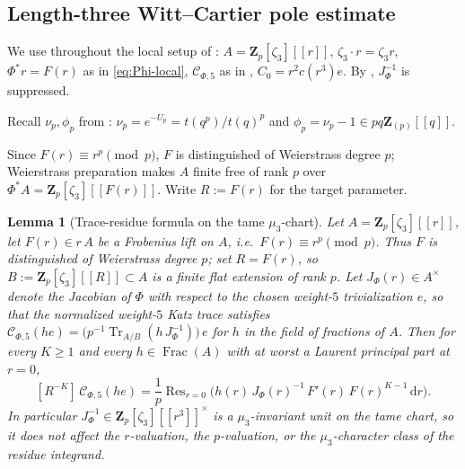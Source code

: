 \documentclass[11pt]{amsart}
\newtheorem{lemma}[theorem]{Lemma}
\theoremstyle{definition}
\theoremstyle{remark}
\newcommand{\Z}{\mathbf{Z}}
\newcommand{\dd}{\mathrm{d}}
\newcommand{\Res}{\operatorname{Res}}
\newcommand{\Tr}{\operatorname{Tr}}
\begin{document}
\subsection{Length-three Witt--Cartier pole estimate}\label{subsec:pole-estimate}

We use throughout the local setup of : $A=\Z_p[\zeta_3][[r]]$, $\zeta_3\cdot r=\zeta_3 r$, $\Phi^*r=F(r)$ as in \eqref{eq:Phi-local}, $\mathcal C_{\Phi,5}$ as in , $C_0=r^2c(r^3)e$. By , $J_\Phi^{-1}$ is suppressed.

Recall $\nu_p,\phi_p$ from : $\nu_p=e^{-U_p}=t(q^p)/t(q)^p$ and $\phi_p=\nu_p-1\in pq\Z_{(p)}[[q]]$.

Since $F(r)\equiv r^p\pmod p$, $F$ is distinguished of Weierstrass degree $p$; Weierstrass preparation makes $A$ finite free of rank $p$ over $\Phi^*A=\Z_p[\zeta_3][[F(r)]]$. Write $R:=F(r)$ for the target parameter.

\begin{lemma}[Trace-residue formula on the tame $\mu_3$-chart]\label{lem:trace-residue-tame}
Let $A=\Z_p[\zeta_3][[r]]$, let $F(r)\in r\,A$ be a Frobenius lift on $A$, i.e.\ $F(r)\equiv r^p\pmod p$. Thus $F$ is distinguished of Weierstrass degree $p$; set $R=F(r)$, so $B:=\Z_p[\zeta_3][[R]]\subset A$ is a finite flat extension of rank $p$. Let $J_\Phi(r)\in A^\times$ denote the Jacobian of $\Phi$ with respect to the chosen weight-$5$ trivialization $e$, so that the normalized weight-$5$ Katz trace satisfies $\mathcal C_{\Phi,5}(he)=\bigl(p^{-1}\Tr_{A/B}(h\,J_\Phi^{-1})\bigr)\,e$ for $h$ in the field of fractions of $A$. Then for every $K\ge 1$ and every $h\in\operatorname{Frac}(A)$ with at worst a Laurent principal part at $r=0$,
\begin{equation}\label{eq:trace-residue}
[R^{-K}]\,\mathcal C_{\Phi,5}(he)=\frac{1}{p}\Res_{r=0}\!\bigl(h(r)\,J_\Phi(r)^{-1}\,F'(r)\,F(r)^{K-1}\,\dd r\bigr).
\end{equation}
In particular $J_\Phi^{-1}\in\Z_p[\zeta_3][[r^3]]^\times$ is a $\mu_3$-invariant unit on the tame chart, so it does not affect the $r$-valuation, the $p$-valuation, or the $\mu_3$-character class of the residue integrand.
\end{lemma}
\end{document}
